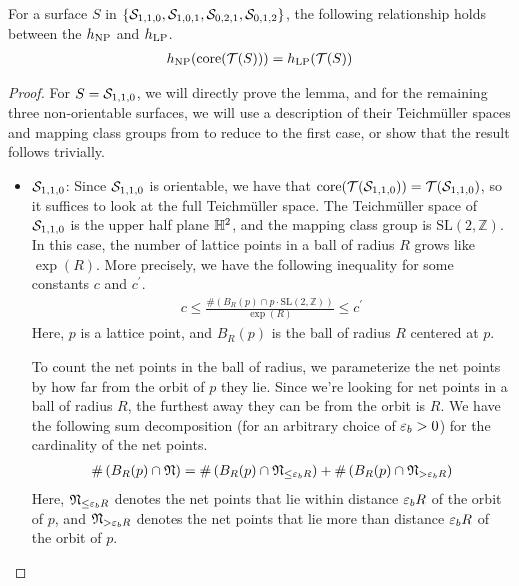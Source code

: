 
\begin{lemma}
  \label{lem:entropy-equality-base-case}
  For a surface $S$ in $\left\{ \mathcal{S}_{1,1,0}, \mathcal{S}_{1,0,1}, \mathcal{S}_{0,2,1}, \mathcal{S}_{0,1,2} \right\}$, the following relationship holds between the $h_{\mathrm{NP}}$ and $h_{\mathrm{LP}}$.
  \begin{align*}
    h_{\mathrm{NP}}(\mathrm{core}(\mathcal{T}(S))) = h_{\mathrm{LP}}(\mathcal{T}(S))
  \end{align*}
\end{lemma}

\begin{proof}
  For $S = \mathcal{S}_{1,1,0}$, we will directly prove the lemma, and for the remaining three non-orientable surfaces, we will use a description of their Teichmüller spaces and mapping class groups from \textcite{gendulphe2017whats} to reduce to the first case, or show that the result follows trivially.
  \begin{itemize}
  \item $\mathcal{S}_{1,1,0}$: Since $\mathcal{S}_{1,1,0}$ is orientable, we have that $\mathrm{core(\mathcal{T}(\mathcal{S}_{1,1,0}))} = \mathcal{T}(\mathcal{S}_{1,1,0})$, so it suffices to look at the full Teichmüller space.
    The Teichmüller space of $\mathcal{S}_{1,1,0}$ is the upper half plane $\mathbb{H}^2$, and the mapping class group is $\mathrm{SL}(2, \mathbb{Z})$.
    In this case, the number of lattice points in a ball of radius $R$ grows like $\exp(R)$.
    More precisely, we have the following inequality for some constants $c$ and $c^\prime$.
    \begin{align}
      c \leq \frac{\#\left( B_R(p) \cap p \cdot \mathrm{SL}(2, \mathbb{Z}) \right)}{\exp(R)} \leq c^{\prime} \label{eq:lattice-point-count}
    \end{align}
    Here, $p$ is a lattice point, and $B_R(p)$ is the ball of radius $R$ centered at $p$.

    To count the net points in the ball of radius, we parameterize the net points by how far from the orbit of $p$ they lie. Since we're looking for net points in a ball of radius $R$, the furthest away they can be from the orbit is $R$.
    We have the following sum decomposition (for an arbitrary choice of $\varepsilon_b > 0$) for the cardinality of the net points.
    \begin{align}
      \label{eq:net-point-decomposition-base-case}
      \#\left( B_R(p) \cap \mathfrak{N} \right) = \#\left( B_R(p) \cap \mathfrak{N}_{\leq \varepsilon_b R} \right) + \#\left( B_R(p) \cap \mathfrak{N}_{> \varepsilon_b R} \right)
    \end{align}
    Here, $\mathfrak{N}_{\leq \varepsilon_b R}$ denotes the net points that lie within distance $\varepsilon_b R$ of the orbit of $p$, and $\mathfrak{N}_{> \varepsilon_b R}$ denotes the net points that lie more than distance $\varepsilon_b R$ of the orbit of $p$.


\end{itemize}
\end{proof}
